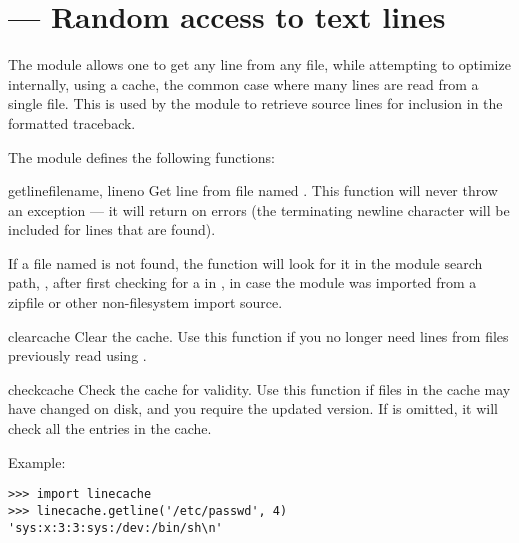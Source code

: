 \section{ ---
         Random access to text lines}



The  module allows one to get any line from any file,
while attempting to optimize internally, using a cache, the common case
where many lines are read from a single file.  This is used by the
 module to retrieve source lines for inclusion in 
the formatted traceback.

The  module defines the following functions:

\begin{funcdesc}{getline}{filename, lineno}
Get line  from file named . This function
will never throw an exception --- it will return  on errors
(the terminating newline character will be included for lines that are
found).

If a file named  is not found, the function will look
for it in the module search path,
, after first checking for a  
in , in case the module was imported from a zipfile
or other non-filesystem import source. 

\end{funcdesc}

\begin{funcdesc}{clearcache}{}
Clear the cache.  Use this function if you no longer need lines from
files previously read using .
\end{funcdesc}

\begin{funcdesc}{checkcache}{}
Check the cache for validity.  Use this function if files in the cache 
may have changed on disk, and you require the updated version.  If
 is omitted, it will check all the entries in the cache.
\end{funcdesc}

Example:

\begin{verbatim}
>>> import linecache
>>> linecache.getline('/etc/passwd', 4)
'sys:x:3:3:sys:/dev:/bin/sh\n'
\end{verbatim}
